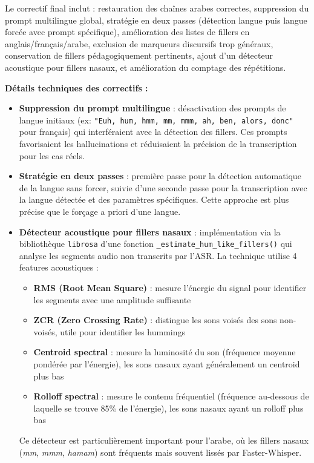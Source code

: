 ﻿\documentclass[12pt,a4paper]{article}
\begin{document}
Le correctif final inclut : restauration des chaînes arabes correctes, suppression du prompt multilingue global, stratégie en deux passes (détection langue puis langue forcée avec prompt spécifique), amélioration des listes de fillers en anglais/français/arabe, exclusion de marqueurs discursifs trop généraux, conservation de fillers pédagogiquement pertinents, ajout d'un détecteur acoustique pour fillers nasaux, et amélioration du comptage des répétitions.

\textbf{Détails techniques des correctifs :}

\begin{itemize}
    \item \textbf{Suppression du prompt multilingue} : désactivation des prompts de langue initiaux (ex: \texttt{"Euh, hum, hmm, mm, mmm, ah, ben, alors, donc"} pour français) qui interféraient avec la détection des fillers. Ces prompts favorisaient les hallucinations et réduisaient la précision de la transcription pour les cas réels.

    \item \textbf{Stratégie en deux passes} : première passe pour la détection automatique de la langue sans forcer, suivie d'une seconde passe pour la transcription avec la langue détectée et des paramètres spécifiques. Cette approche est plus précise que le forçage a priori d'une langue.

    \item \textbf{Détecteur acoustique pour fillers nasaux} : implémentation via la bibliothèque \texttt{librosa} d'une fonction \texttt{\_estimate\_hum\_like\_fillers()} qui analyse les segments audio non transcrits par l'ASR. La technique utilise 4 features acoustiques :
    \begin{itemize}
        \item \textbf{RMS (Root Mean Square)} : mesure l'énergie du signal pour identifier les segments avec une amplitude suffisante
        \item \textbf{ZCR (Zero Crossing Rate)} : distingue les sons voisés des sons non-voisés, utile pour identifier les hummings
        \item \textbf{Centroid spectral} : mesure la luminosité du son (fréquence moyenne pondérée par l'énergie), les sons nasaux ayant généralement un centroid plus bas
        \item \textbf{Rolloff spectral} : mesure le contenu fréquentiel (fréquence au-dessous de laquelle se trouve 85\% de l'énergie), les sons nasaux ayant un rolloff plus bas
    \end{itemize}
    Ce détecteur est particulièrement important pour l'arabe, où les fillers nasaux (\textit{mm}, \textit{mmm}, \textit{hamam}) sont fréquents mais souvent lissés par Faster-Whisper.
\end{itemize}
\end{document}
